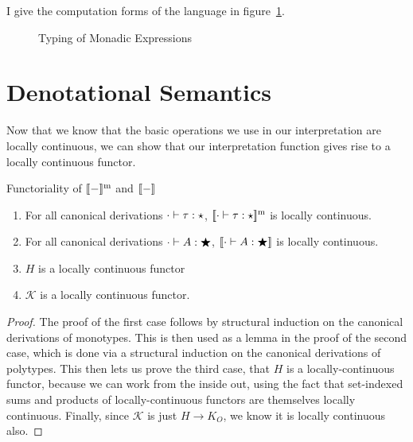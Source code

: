 I give the computation forms of the language in
figure~\ref{lang-typing-monadic}. 


\begin{figure}
\caption{Typing of Monadic Expressions}
\label{lang-typing-monadic}
\end{figure}

\section{Denotational Semantics}

Now that we know that the basic operations we use in our
interpretation are locally continuous, we can show that our 
interpretation function gives rise to a locally continuous
functor. 

\begin{lemma}{Functoriality of $\interpmono{-}$ and $\interp{-}$}
  \begin{enumerate}
  \item For all canonical derivations $\judgeWK[\cdot]{\tau}{\star}$, 
    $\interpmono{\judgeWK[\cdot]{\tau}{\star}}$ is locally continuous. 
  \item For all canonical derivations $\judgeWK[\cdot]{A}{\bigstar}$, 
    $\interp{\judgeWK[\cdot]{A}{\bigstar}}$ is locally continuous. 
  \item $H$ is a locally continuous functor
  \item $\mathcal{K}$ is a locally continuous functor. 
  \end{enumerate}
\end{lemma}

\begin{proof}
 The proof of the first case follows by structural
induction on the canonical derivations of monotypes. This is then used
as a lemma in the proof of the second case, which is done via a
structural induction on the canonical derivations of polytypes. This
then lets us prove the third case, that $H$ is a locally-continuous
functor, because we can work from the inside out, using the fact that
set-indexed sums and products of locally-continuous functors are
themselves locally continuous. Finally, since $\mathcal{K}$ is just 
$H \to K_O$, we know it is locally continuous also. 
\end{proof}

